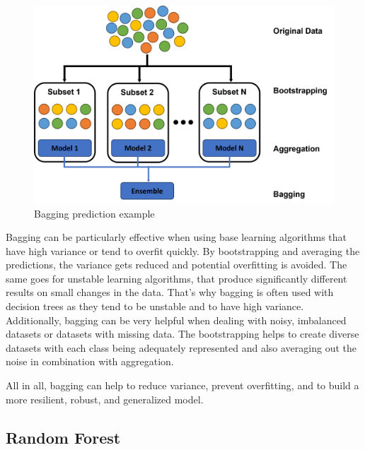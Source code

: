 \begin{figure}[htbp]
    \centering
    \includegraphics[width=.5\textwidth]{figures/bagging_prediction}
    \caption{Bagging prediction example}
\end{figure}


Bagging can be particularly effective when using base learning algorithms
that have high variance or tend to overfit quickly. By bootstrapping and 
averaging the predictions, the variance gets reduced and potential overfitting
is avoided.
The same goes for unstable learning algorithms, that produce significantly different
results on small changes in the data. That's why bagging is often used with decision
trees as they tend to be unstable and to have high variance.
Additionally, bagging can be very helpful when dealing with noisy, imbalanced 
datasets or datasets with missing data. The bootstrapping helps to create 
diverse datasets with each class being adequately represented and also averaging
out the noise in combination with aggregation.


All in all, bagging can help to reduce variance, prevent overfitting, and to build
a more resilient, robust, and generalized model.

\subsection{Random Forest}


